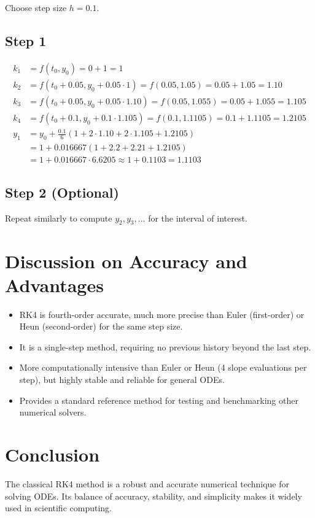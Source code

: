 \documentclass[11pt,a4paper]{article}
\begin{document}
Choose step size \(h = 0.1\).

\subsection{Step 1}
\[
\begin{aligned}
k_1 &= f(t_0, y_0) = 0 + 1 = 1 \\
k_2 &= f(t_0 + 0.05, y_0 + 0.05 \cdot 1) = f(0.05, 1.05) = 0.05 + 1.05 = 1.10 \\
k_3 &= f(t_0 + 0.05, y_0 + 0.05 \cdot 1.10) = f(0.05, 1.055) = 0.05 + 1.055 = 1.105 \\
k_4 &= f(t_0 + 0.1, y_0 + 0.1 \cdot 1.105) = f(0.1, 1.1105) = 0.1 + 1.1105 = 1.2105 \\
y_1 &= y_0 + \frac{0.1}{6} (1 + 2 \cdot 1.10 + 2 \cdot 1.105 + 1.2105) \\
&= 1 + 0.016667 (1 + 2.2 + 2.21 + 1.2105) \\
&= 1 + 0.016667 \cdot 6.6205 \approx 1 + 0.1103 = 1.1103
\end{aligned}
\]

\subsection{Step 2 (Optional)}
Repeat similarly to compute \(y_2, y_3, \dots\) for the interval of interest.

\section{Discussion on Accuracy and Advantages}
\begin{itemize}
    \item RK4 is fourth-order accurate, much more precise than Euler (first-order) or Heun (second-order) for the same step size.  
    \item It is a single-step method, requiring no previous history beyond the last step.  
    \item More computationally intensive than Euler or Heun (4 slope evaluations per step), but highly stable and reliable for general ODEs.  
    \item Provides a standard reference method for testing and benchmarking other numerical solvers.
\end{itemize}

\section{Conclusion}
The classical RK4 method is a robust and accurate numerical technique for solving ODEs. Its balance of accuracy, stability, and simplicity makes it widely used in scientific computing.
\end{document}
